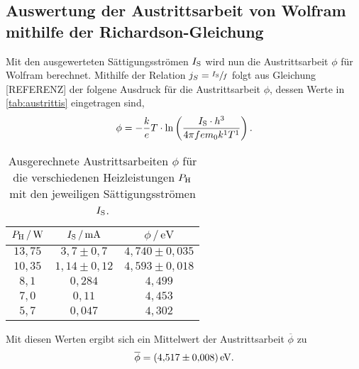 \subsection{Auswertung der Austrittsarbeit von Wolfram mithilfe der Richardson-Gleichung}
\label{subsec:richard}

Mit den ausgewerteten Sättigungsströmen $I_{\text S}$ wird nun die Austrittsarbeit $\phi$ für Wolfram berechnet. Mithilfe der Relation
$j_S= \sfrac{I_{\text S}}{f}$ folgt aus Gleichung [REFERENZ] der folgene Ausdruck für die Austrittsarbeit $\phi$, dessen Werte in \autoref{tab:austrittis} eingetragen sind,
\begin{align*}
  \phi = -\frac ke T\cdot\ln\left(\frac{I_{\text S}\cdot h^3}{4\pi fem_0k^1T^1}\right).
\end{align*}

\begin{table}[H]
  \caption{Ausgerechnete Austrittsarbeiten $\phi$ für die verschiedenen Heizleistungen $P_{\text H}$ mit den jeweiligen Sättigungsströmen $I_{\text S}$.}
  \label{tab:austrittis}
  \centering
  \begin{tabular}{c c c}
      \toprule
      $P_{\text H} \,/\, \si{\watt}$ & $I_{\text S} \,/\, \si{\milli\ampere}$ & $\phi \,/\, \si{\eV}$\\
      \midrule
      $13,75$ & $3,7 \pm 0,7$   & $4,740 \pm 0,035$ \\
      $10,35$ & $1,14 \pm 0,12$ & $4,593 \pm 0,018$ \\
      $8,1$   & $0,284$         & $4,499$ \\
      $7,0$   & $0,11$          & $4,453$ \\
      $5,7$   & $0,047$         & $4,302$ \\
      \bottomrule
    \end{tabular}
\end{table}

\noindent
Mit diesen Werten ergibt sich ein Mittelwert der Austrittsarbeit $\overline \phi$ zu
\begin{align*}
  \overline \phi = \SI{4,517 \pm 0,008}{\eV}.
\end{align*}